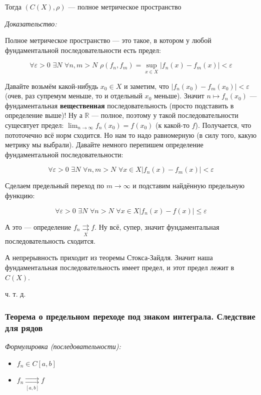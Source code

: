 \documentclass{article}
\def\dbl{\,\,}
\def\rsh#1{\underset{#1}{\rightrightarrows}}
\begin{document}
Тогда $\left(C(X), \rho \right)$ --- полное метрическое пространство

\textit{Доказательство:}

Полное метрическое пространство --- это такое, в котором у любой фундаментальной последовательности есть предел:

\[\forall \varepsilon > 0 \dbl \exists N \dbl \forall n, m > N \dbl \rho(f_n, f_m) = \sup_{x \in X}|f_n(x) - f_m(x)| < \varepsilon\]

Давайте возьмём какой-нибудь $x_0 \in X$ и заметим, что $|f_n(x_0) - f_m(x_0)| < \varepsilon$ (очев, раз супремум меньше, то и отдельный $x_0$ меньше). Значит $n \mapsto f_n(x_0)$ --- фундаментальная \textbf{вещественная} последовательность (просто подставить в определение выше)! Ну а $\mathbb{R}$ --- полное, поэтому у такой последовательности сущесвтует предел: $\lim_{n \rightarrow \infty} f_n(x_0) = f(x_0)$ (к какой-то $f$). Получается, что пототочечно всё норм сходится. Но нам то надо равномерную (в силу того, какую метрику мы выбрали). Давайте немного перепишем определение фундаментальной последовательности:

\[\forall \varepsilon > 0 \dbl \exists N \dbl \forall n, m > N \dbl \forall x \in X |f_n(x) - f_m(x)| < \varepsilon\]

Сделаем предельный переход по $m \rightarrow \infty$ и подставим найдённую предельную функцию: 

\[\forall \varepsilon > 0 \dbl \exists N \dbl \forall n > N \dbl \forall x \in X |f_n(x) - f(x)| \le \varepsilon\]

А это --- определение $f_n \rsh{X} f$. Ну всё, супер, значит фундаментальная последовательность сходится.

А непрерывность приходит из теоремы Стокса-Зайдля. Значит наша фундаментальная последовательность имеет предел, и этот предел лежит в $C(X)$.

ч. т. д. 

\subsubsection{Теорема о предельном переходе под знаком интеграла. Следствие для рядов}
\textit{Формулировка (последовательности):}

\begin{itemize}
    \item $f_n \in C[a, b]$
    \item $f_n \rsh{[a, b]} f$
\end{itemize}
\end{document}
